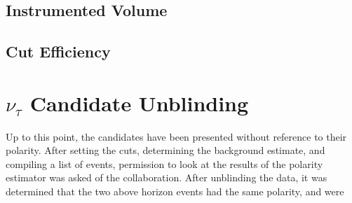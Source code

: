 	\subsection{Instrumented Volume}
	
	\subsection{Cut Efficiency}
	

\section{$\nu_{\tau}$ Candidate Unblinding}
	Up to this point, the candidates have been presented without reference to their polarity.  After setting the cuts, determining the background estimate, and compiling a list of events, permission to look at the results of the polarity estimator was asked of the collaboration.  After unblinding the data, it was determined that the two above horizon events had the same polarity, and were 


	




